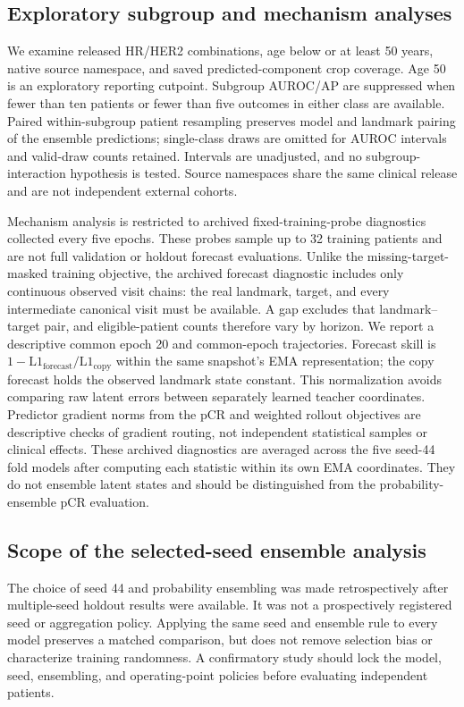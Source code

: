 \subsection{Exploratory subgroup and mechanism analyses}
We examine released HR/HER2 combinations, age below or at least 50 years, native source namespace, and saved predicted-component crop coverage. Age 50 is an exploratory reporting cutpoint. Subgroup AUROC/AP are suppressed when fewer than ten patients or fewer than five outcomes in either class are available. Paired within-subgroup patient resampling preserves model and landmark pairing of the ensemble predictions; single-class draws are omitted for AUROC intervals and valid-draw counts retained. Intervals are unadjusted, and no subgroup-interaction hypothesis is tested. Source namespaces share the same clinical release and are not independent external cohorts.

Mechanism analysis is restricted to archived fixed-training-probe diagnostics collected every five epochs. These probes sample up to 32 training patients and are not full validation or holdout forecast evaluations. Unlike the missing-target-masked training objective, the archived forecast diagnostic includes only continuous observed visit chains: the real landmark, target, and every intermediate canonical visit must be available. A gap excludes that landmark--target pair, and eligible-patient counts therefore vary by horizon. We report a descriptive common epoch 20 and common-epoch trajectories. Forecast skill is $1-\mathrm{L1}_{\mathrm{forecast}}/\mathrm{L1}_{\mathrm{copy}}$ within the same snapshot's EMA representation; the copy forecast holds the observed landmark state constant. This normalization avoids comparing raw latent errors between separately learned teacher coordinates. Predictor gradient norms from the pCR and weighted rollout objectives are descriptive checks of gradient routing, not independent statistical samples or clinical effects. These archived diagnostics are averaged across the five seed-44 fold models after computing each statistic within its own EMA coordinates. They do not ensemble latent states and should be distinguished from the probability-ensemble pCR evaluation.

\subsection{Scope of the selected-seed ensemble analysis}
The choice of seed 44 and probability ensembling was made retrospectively after multiple-seed holdout results were available. It was not a prospectively registered seed or aggregation policy. Applying the same seed and ensemble rule to every model preserves a matched comparison, but does not remove selection bias or characterize training randomness. A confirmatory study should lock the model, seed, ensembling, and operating-point policies before evaluating independent patients.
